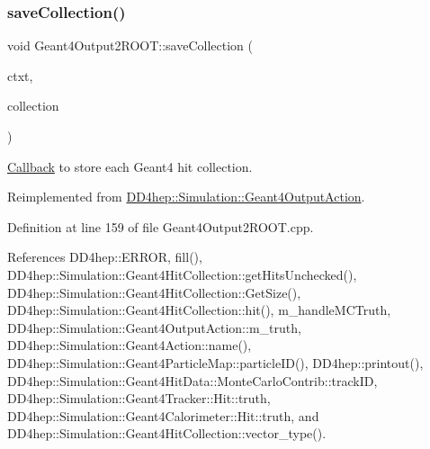 \subsubsection{\texorpdfstring{save\+Collection()}{saveCollection()}}
{\footnotesize\ttfamily void Geant4\+Output2\+R\+O\+O\+T\+::save\+Collection (\begin{DoxyParamCaption}\item[{\hyperlink{class_d_d4hep_1_1_simulation_1_1_geant4_output_action_1_1_output_context}{Output\+Context}$<$ G4\+Event $>$ \&}]{ctxt,  }\item[{\hyperlink{class_g4_v_hits_collection}{G4\+V\+Hits\+Collection} $\ast$}]{collection }\end{DoxyParamCaption})\hspace{0.3cm}{\ttfamily [virtual]}}



\hyperlink{class_d_d4hep_1_1_callback}{Callback} to store each Geant4 hit collection. 



Reimplemented from \hyperlink{class_d_d4hep_1_1_simulation_1_1_geant4_output_action_aa43d1f01dbcb11ac1d937a878d87a90f}{D\+D4hep\+::\+Simulation\+::\+Geant4\+Output\+Action}.



Definition at line 159 of file Geant4\+Output2\+R\+O\+O\+T.\+cpp.



References D\+D4hep\+::\+E\+R\+R\+OR, fill(), D\+D4hep\+::\+Simulation\+::\+Geant4\+Hit\+Collection\+::get\+Hits\+Unchecked(), D\+D4hep\+::\+Simulation\+::\+Geant4\+Hit\+Collection\+::\+Get\+Size(), D\+D4hep\+::\+Simulation\+::\+Geant4\+Hit\+Collection\+::hit(), m\+\_\+handle\+M\+C\+Truth, D\+D4hep\+::\+Simulation\+::\+Geant4\+Output\+Action\+::m\+\_\+truth, D\+D4hep\+::\+Simulation\+::\+Geant4\+Action\+::name(), D\+D4hep\+::\+Simulation\+::\+Geant4\+Particle\+Map\+::particle\+I\+D(), D\+D4hep\+::printout(), D\+D4hep\+::\+Simulation\+::\+Geant4\+Hit\+Data\+::\+Monte\+Carlo\+Contrib\+::track\+ID, D\+D4hep\+::\+Simulation\+::\+Geant4\+Tracker\+::\+Hit\+::truth, D\+D4hep\+::\+Simulation\+::\+Geant4\+Calorimeter\+::\+Hit\+::truth, and D\+D4hep\+::\+Simulation\+::\+Geant4\+Hit\+Collection\+::vector\+\_\+type().

\hypertarget{class_d_d4hep_1_1_simulation_1_1_geant4_output2_r_o_o_t_a0562da9b5fdb0f81fa8d14457fd3f319}{}\label{class_d_d4hep_1_1_simulation_1_1_geant4_output2_r_o_o_t_a0562da9b5fdb0f81fa8d14457fd3f319} 
